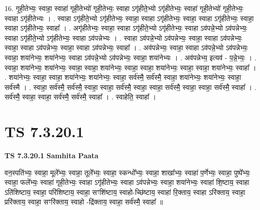 \documentclass[17pt]{extarticle}
\begin{document}
16. गृ॒ही॒तेभ्यः॒ स्वाहा॒ स्वाहा॑ गृही॒तेभ्यो॑ गृही॒तेभ्यः॒ स्वाहा ऽगृ॑हीते॒भ्यो ऽगृ॑हीतेभ्यः॒ स्वाहा॑ गृही॒तेभ्यो॑ गृही॒तेभ्यः॒ स्वाहा ऽगृ॑हीतेभ्यः । . स्वाहा ऽगृ॑हीते॒भ्यो ऽगृ॑हीतेभ्यः॒ स्वाहा॒ स्वाहा ऽगृ॑हीतेभ्यः॒ स्वाहा॒ स्वाहा ऽगृ॑हीतेभ्यः॒ स्वाहा॒ स्वाहा ऽगृ॑हीतेभ्यः॒ स्वाहा᳚ । . अगृ॑हीतेभ्यः॒ स्वाहा॒ स्वाहा ऽगृ॑हीते॒भ्यो ऽगृ॑हीतेभ्यः॒ स्वाहा ऽव॑पन्ने॒भ्यो ऽव॑पन्नेभ्यः॒ स्वाहा ऽगृ॑हीते॒भ्यो ऽगृ॑हीतेभ्यः॒ स्वाहा ऽव॑पन्नेभ्यः । . स्वाहा ऽव॑पन्ने॒भ्यो ऽव॑पन्नेभ्यः॒ स्वाहा॒ स्वाहा ऽव॑पन्नेभ्यः॒ स्वाहा॒ स्वाहा ऽव॑पन्नेभ्यः॒ स्वाहा॒ स्वाहा ऽव॑पन्नेभ्यः॒ स्वाहा᳚ । . अव॑पन्नेभ्यः॒ स्वाहा॒ स्वाहा ऽव॑पन्ने॒भ्यो ऽव॑पन्नेभ्यः॒ स्वाहा॒ शया॑नेभ्यः॒ शया॑नेभ्यः॒ स्वाहा ऽव॑पन्ने॒भ्यो ऽव॑पन्नेभ्यः॒ स्वाहा॒ शया॑नेभ्यः । . अव॑पन्नेभ्य॒ इत्यव॑ - प॒न्ने॒भ्यः॒ । . स्वाहा॒ शया॑नेभ्यः॒ शया॑नेभ्यः॒ स्वाहा॒ स्वाहा॒ शया॑नेभ्यः॒ स्वाहा॒ स्वाहा॒ शया॑नेभ्यः॒ स्वाहा॒ स्वाहा॒ शया॑नेभ्यः॒ स्वाहा᳚ । . शया॑नेभ्यः॒ स्वाहा॒ स्वाहा॒ शया॑नेभ्यः॒ शया॑नेभ्यः॒ स्वाहा॒ सर्व॑स्मै॒ सर्व॑स्मै॒ स्वाहा॒ शया॑नेभ्यः॒ शया॑नेभ्यः॒ स्वाहा॒ सर्व॑स्मै । . स्वाहा॒ सर्व॑स्मै॒ सर्व॑स्मै॒ स्वाहा॒ स्वाहा॒ सर्व॑स्मै॒ स्वाहा॒ स्वाहा॒ सर्व॑स्मै॒ स्वाहा॒ स्वाहा॒ सर्व॑स्मै॒ स्वाहा᳚ । . सर्व॑स्मै॒ स्वाहा॒ स्वाहा॒ सर्व॑स्मै॒ सर्व॑स्मै॒ स्वाहा᳚ । . स्वाहेति॒ स्वाहा᳚ । \newline
\pagebreak
{}

\section{ TS 7.3.20.1 }

\textbf{TS 7.3.20.1 } \newline
\textbf{Samhita Paata} \newline

वन॒स्पति॑भ्यः॒ स्वाहा॒ मूले᳚भ्यः॒ स्वाहा॒ तूले᳚भ्यः॒ स्वाहा॒ स्कन्धो᳚भ्यः॒ स्वाहा॒ शाखा᳚भ्यः॒ स्वाहा॑ प॒र्णेभ्यः॒ स्वाहा॒ पुष्पे᳚भ्यः॒ स्वाहा॒ फले᳚भ्यः॒ स्वाहा॑ गृही॒तेभ्यः॒ स्वाहा ऽगृ॑हीतेभ्यः॒ स्वाहा ऽव॑पन्नेभ्यः॒ स्वाहा॒ शया॑नेभ्यः॒ स्वाहा॑ शि॒ष्टाय॒ स्वाहा ऽति॑शिष्टाय॒ स्वाहा॒ परि॑शिष्टाय॒ स्वाहा॒ सꣳशि॑ष्टाय॒ स्वाहो-च्छि॑ष्टाय॒ स्वाहा॑ रि॒क्ताय॒ स्वाहा ऽरि॑क्ताय॒ स्वाहा॒ प्ररि॑क्ताय॒ स्वाहा॒ सꣳरि॑क्ताय॒ स्वाहो -द्रि॑क्ताय॒ स्वाहा॒ सर्व॑स्मै॒ स्वाहा᳚ ॥ \newline
\end{document}
